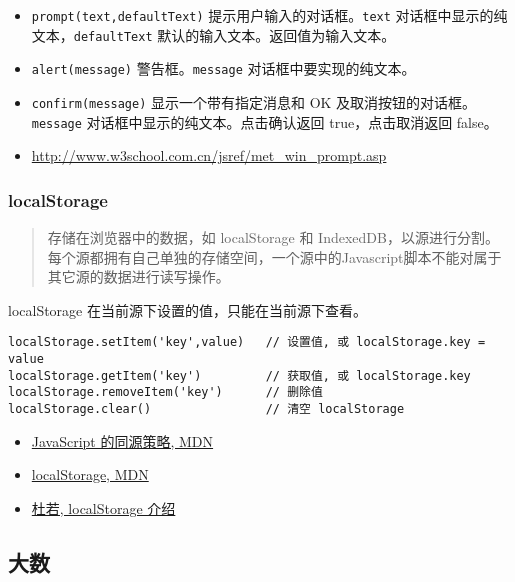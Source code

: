 \begin{itemize}
\item
  \lstinline!prompt(text,defaultText)!
  提示用户输入的对话框。\lstinline!text!
  对话框中显示的纯文本，\lstinline!defaultText!
  默认的输入文本。返回值为输入文本。
\item
  \lstinline!alert(message)! 警告框。\lstinline!message!
  对话框中要实现的纯文本。
\item
  \lstinline!confirm(message)! 显示一个带有指定消息和 OK
  及取消按钮的对话框。\lstinline!message!
  对话框中显示的纯文本。点击确认返回 true，点击取消返回 false。
\item
  \url{http://www.w3school.com.cn/jsref/met_win_prompt.asp}
\end{itemize}

\subsubsection{localStorage}\label{localstorage}

\begin{quote}
存储在浏览器中的数据，如 localStorage 和
IndexedDB，以源进行分割。每个源都拥有自己单独的存储空间，一个源中的Javascript脚本不能对属于其它源的数据进行读写操作。
\end{quote}

localStorage 在当前源下设置的值，只能在当前源下查看。

\begin{lstlisting}
localStorage.setItem('key',value)   // 设置值, 或 localStorage.key = value
localStorage.getItem('key')         // 获取值, 或 localStorage.key
localStorage.removeItem('key')      // 删除值
localStorage.clear()                // 清空 localStorage
\end{lstlisting}

\begin{itemize}
\tightlist
\item
  \href{https://developer.mozilla.org/zh-CN/docs/Web/Security/Same-origin_policy}{JavaScript
  的同源策略, MDN}
\item
  \href{https://developer.mozilla.org/en-US/docs/Web/API/Storage/LocalStorage}{localStorage,
  MDN}
\item
  \href{http://wikieswan.github.io/javascript/2015/04/03/html5-api-localstorage/}{杜若,
  localStorage 介绍}
\end{itemize}

\subsection{大数}\label{ux5927ux6570}

